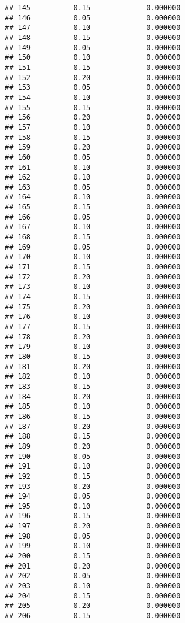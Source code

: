 \documentclass[
]{article}
\begin{document}
\begin{verbatim}
## 145          0.15             0.000000
## 146          0.05             0.000000
## 147          0.10             0.000000
## 148          0.15             0.000000
## 149          0.05             0.000000
## 150          0.10             0.000000
## 151          0.15             0.000000
## 152          0.20             0.000000
## 153          0.05             0.000000
## 154          0.10             0.000000
## 155          0.15             0.000000
## 156          0.20             0.000000
## 157          0.10             0.000000
## 158          0.15             0.000000
## 159          0.20             0.000000
## 160          0.05             0.000000
## 161          0.10             0.000000
## 162          0.10             0.000000
## 163          0.05             0.000000
## 164          0.10             0.000000
## 165          0.15             0.000000
## 166          0.05             0.000000
## 167          0.10             0.000000
## 168          0.15             0.000000
## 169          0.05             0.000000
## 170          0.10             0.000000
## 171          0.15             0.000000
## 172          0.20             0.000000
## 173          0.10             0.000000
## 174          0.15             0.000000
## 175          0.20             0.000000
## 176          0.10             0.000000
## 177          0.15             0.000000
## 178          0.20             0.000000
## 179          0.10             0.000000
## 180          0.15             0.000000
## 181          0.20             0.000000
## 182          0.10             0.000000
## 183          0.15             0.000000
## 184          0.20             0.000000
## 185          0.10             0.000000
## 186          0.15             0.000000
## 187          0.20             0.000000
## 188          0.15             0.000000
## 189          0.20             0.000000
## 190          0.05             0.000000
## 191          0.10             0.000000
## 192          0.15             0.000000
## 193          0.20             0.000000
## 194          0.05             0.000000
## 195          0.10             0.000000
## 196          0.15             0.000000
## 197          0.20             0.000000
## 198          0.05             0.000000
## 199          0.10             0.000000
## 200          0.15             0.000000
## 201          0.20             0.000000
## 202          0.05             0.000000
## 203          0.10             0.000000
## 204          0.15             0.000000
## 205          0.20             0.000000
## 206          0.15             0.000000

\end{verbatim}
\end{document}
